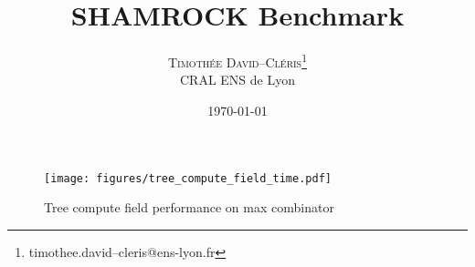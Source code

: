 \documentclass{article}
\title{\textsc{SHAMROCK} Benchmark} %
\author{%
\textsc{Timothée David--Cléris}\thanks{timothee.david--cleris@ens-lyon.fr} \\[1ex] %
\normalsize CRAL ENS de Lyon \\ %
}
\date{\today}
\begin{document}
\maketitle

\begin{figure}[ht!]
\center
\texttt{[image: figures/tree\_compute\_field\_time.pdf]}
\caption{Tree compute field performance on max combinator}
\end{figure}
\end{document}
